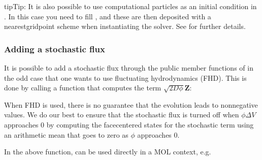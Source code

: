 \documentclass[letterpaper,10pt,english]{sphinxmanual}
\begin{document}
\begin{sphinxadmonition}{tip}{Tip:}
It is also possible to use computational particles as an initial condition in .
In this case you need to fill , and these are then deposited with a nearest\sphinxhyphen{}grid\sphinxhyphen{}point scheme when instantiating the solver.
See {\hyperref[\detokenize{Source/Particles:chap-particles}]{}} for further details.
\end{sphinxadmonition}


\subsubsection{Adding a stochastic flux}
\label{\detokenize{Solvers/CDR:adding-a-stochastic-flux}}
It is possible to add a stochastic flux through the public member functions of  in the odd case that one wants to use fluctuating hydrodynamics (FHD).
This is done by calling a function that computes the term \(\sqrt{2D\phi}\mathbf{Z}\):

\begin{sphinxVerbatim}[commandchars=\\\{\},formatcom=\scriptsize]
     
\end{sphinxVerbatim}

When FHD is used, there is no guarantee that the evolution leads to non\sphinxhyphen{}negative values.
We do our best to ensure that the stochastic flux is turned off when \(\phi \Delta V\) approaches 0 by computing the face\sphinxhyphen{}centered states for the stochastic term using an arithmetic mean that goes to zero as \(\phi\) approaches 0.

In the above function,  can be used directly in a MOL context, e.g.
\end{document}
